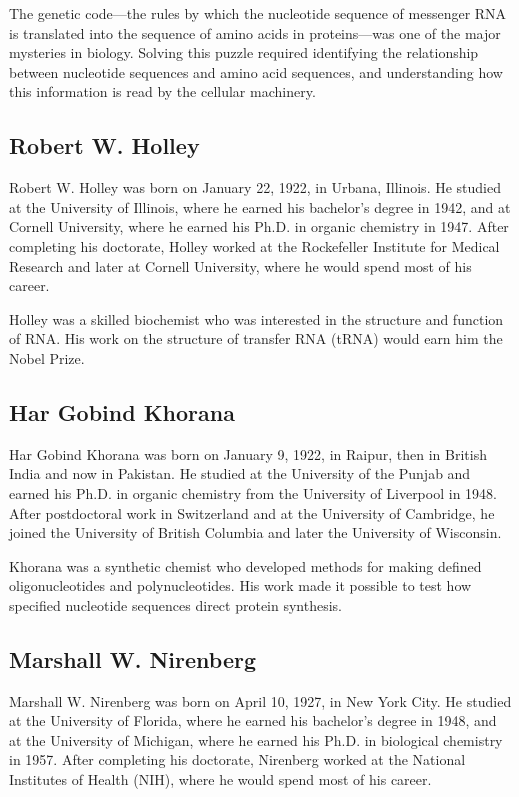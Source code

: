 The genetic code---the rules by which the nucleotide sequence of messenger RNA is translated into the sequence of amino acids in proteins---was one of the major mysteries in biology. Solving this puzzle required identifying the relationship between nucleotide sequences and amino acid sequences, and understanding how this information is read by the cellular machinery.

\subsection{Robert W. Holley}

Robert W. Holley was born on January 22, 1922, in Urbana, Illinois. He studied at the University of Illinois, where he earned his bachelor's degree in 1942, and at Cornell University, where he earned his Ph.D. in organic chemistry in 1947. After completing his doctorate, Holley worked at the Rockefeller Institute for Medical Research and later at Cornell University, where he would spend most of his career.

Holley was a skilled biochemist who was interested in the structure and function of RNA. His work on the structure of transfer RNA (tRNA) would earn him the Nobel Prize.

\subsection{Har Gobind Khorana}

Har Gobind Khorana was born on January 9, 1922, in Raipur, then in British India and now in Pakistan. He studied at the University of the Punjab and earned his Ph.D. in organic chemistry from the University of Liverpool in 1948. After postdoctoral work in Switzerland and at the University of Cambridge, he joined the University of British Columbia and later the University of Wisconsin.

Khorana was a synthetic chemist who developed methods for making defined oligonucleotides and polynucleotides. His work made it possible to test how specified nucleotide sequences direct protein synthesis.

\subsection{Marshall W. Nirenberg}

Marshall W. Nirenberg was born on April 10, 1927, in New York City. He studied at the University of Florida, where he earned his bachelor's degree in 1948, and at the University of Michigan, where he earned his Ph.D. in biological chemistry in 1957. After completing his doctorate, Nirenberg worked at the National Institutes of Health (NIH), where he would spend most of his career.

